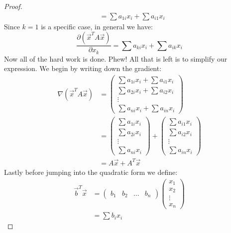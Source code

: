 \documentclass[12pt, letterpaper, onecolumn, conference, final]{IEEEtran}
\theoremstyle{definition}
\theoremstyle{plain}
\begin{document}
\begin{proof}
\begin{equation*}
\begin{split}
&= \sum a_{1i}x_i + \sum a_{i1}x_i 
\end{split}
\end{equation*}
Since $k = 1$ is a specific case, in general we have:
\begin{equation*}
\frac{\partial(\overrightarrow{x}^TA\overrightarrow{x})}{\partial x_k} = \sum a_{ki}x_i + \sum a_{ik}x_i 
\end{equation*}
Now all of the hard work is done. Phew! All that is left is to simplify our expression. We begin by writing down the gradient:
\begin{equation*}
\begin{split}
\nabla (\overrightarrow{x}^TA\overrightarrow{x}) &= \begin{pmatrix}
\sum a_{1i}x_i + \sum a_{i1}x_i \\
\sum a_{2i}x_i + \sum a_{i2}x_i \\
\vdots \\
\sum a_{ni}x_i + \sum a_{in}x_i  
\end{pmatrix} \\
&= \begin{pmatrix}
\sum a_{1i}x_i \\
\sum a_{2i}x_i \\
\vdots \\
\sum a_{ni}x_i 
\end{pmatrix} + \begin{pmatrix}
\sum a_{i1}x_i \\
\sum a_{i2}x_i \\
\vdots \\
\sum a_{in}x_i  
\end{pmatrix} \\
&= A\overrightarrow{x} + A^T\overrightarrow{x}
\end{split}
\end{equation*}
Lastly before jumping into the quadratic form we define:
\renewcommand*{\arraystretch}{1.5}
\begin{equation*}
\begin{split}
\overrightarrow{b}^T \overrightarrow{x} &= \begin{pmatrix}
b_1 & b_2 & \dots & b_n
\end{pmatrix} \begin{pmatrix}
x_1 \\
x_2 \\
\vdots \\
x_n
\end{pmatrix} \\
&= \sum b_ix_i
\end{split}

\end{equation*}
\end{proof}
\end{document}
